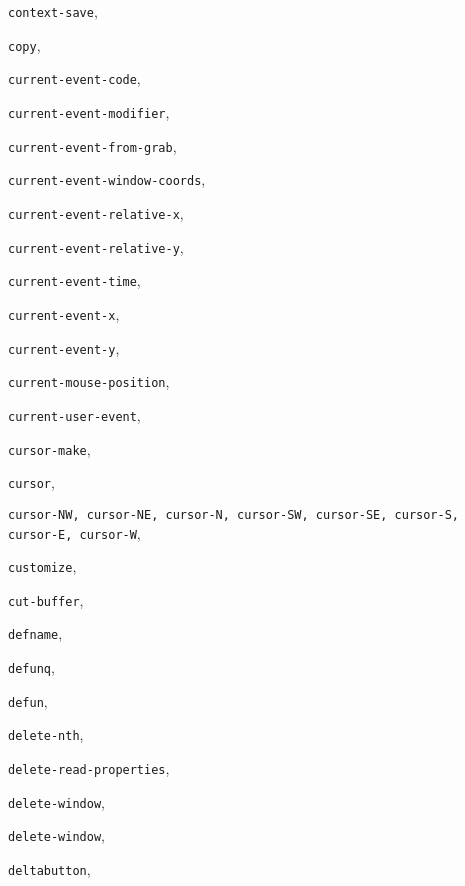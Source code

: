 \begin{theindex}
\item {\tt context-save}, {\bf\pageref{context-save}}
\item {\tt copy}, {\bf\pageref{copy}}
\item {\tt current-event-code}, {\bf\pageref{current-event-code}}
\item {\tt current-event-modifier}, {\bf\pageref{current-event-modifier}}
\item {\tt current-event-from-grab}, {\bf\pageref{current-event-from-grab}}
\item {\tt current-event-window-coords}, {\bf\pageref{current-event-window-coords}}
\item {\tt current-event-relative-x}, {\bf\pageref{current-event-relative-x}}
\item {\tt current-event-relative-y}, {\bf\pageref{current-event-relative-y}}
\item {\tt current-event-time}, {\bf\pageref{current-event-time}}
\item {\tt current-event-x}, {\bf\pageref{current-event-x}}
\item {\tt current-event-y}, {\bf\pageref{current-event-y}}
\item {\tt current-mouse-position}, {\bf\pageref{current-mouse-position}}
\item {\tt current-user-event}, {\bf\pageref{current-user-event}}
\item {\tt cursor-make}, {\bf\pageref{cursor-make}}
\item {\tt cursor}, {\bf\pageref{cursor}}
\item {\tt cursor-NW, cursor-NE, cursor-N, cursor-SW, cursor-SE, cursor-S,
cursor-E, cursor-W}, {\bf\pageref{cursor-NW}}
\item {\tt customize}, {\bf\pageref{customize}}
\item {\tt cut-buffer}, {\bf\pageref{cut-buffer}}
\item {\tt defname}, {\bf\pageref{defname}}
\item {\tt defunq}, {\bf\pageref{defunq}}
\item {\tt defun}, {\bf\pageref{defun}}
\item {\tt delete-nth}, {\bf\pageref{delete-nth}}
\item {\tt delete-read-properties}, {\bf\pageref{delete-read-properties}}
\item {\tt delete-window}, {\bf\pageref{delete-window}}
\item {\tt delete-window}, {\bf\pageref{delete-window}}
\item {\tt deltabutton}, {\bf\pageref{deltabutton}}

\end{theindex}
